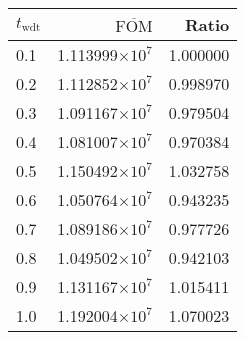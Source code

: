 \begin{tabular}{lrr}
\toprule
$t_{\mathrm{wdt}}$ & $\overline{\mathrm{FOM}}$ &    Ratio \\
\midrule
               0.1 &   1.113999$\times 10^{7}$ & 1.000000 \\
               0.2 &   1.112852$\times 10^{7}$ & 0.998970 \\
               0.3 &   1.091167$\times 10^{7}$ & 0.979504 \\
               0.4 &   1.081007$\times 10^{7}$ & 0.970384 \\
               0.5 &   1.150492$\times 10^{7}$ & 1.032758 \\
               0.6 &   1.050764$\times 10^{7}$ & 0.943235 \\
               0.7 &   1.089186$\times 10^{7}$ & 0.977726 \\
               0.8 &   1.049502$\times 10^{7}$ & 0.942103 \\
               0.9 &   1.131167$\times 10^{7}$ & 1.015411 \\
               1.0 &   1.192004$\times 10^{7}$ & 1.070023 \\
\bottomrule
\end{tabular}
